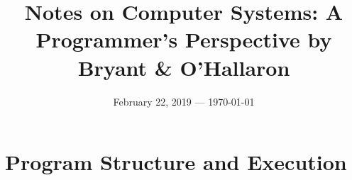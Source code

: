 \documentclass[8pt]{report}
\title{Notes on Computer Systems: A Programmer's Perspective by Bryant \& O'Hallaron}
\date{February 22, 2019 --- \today}
\begin{document}
\maketitle
\tableofcontents

\pagebreak



\part{Program Structure and Execution}


\pagebreak
{}
\glsaddall
\printglossaries
\end{document}
